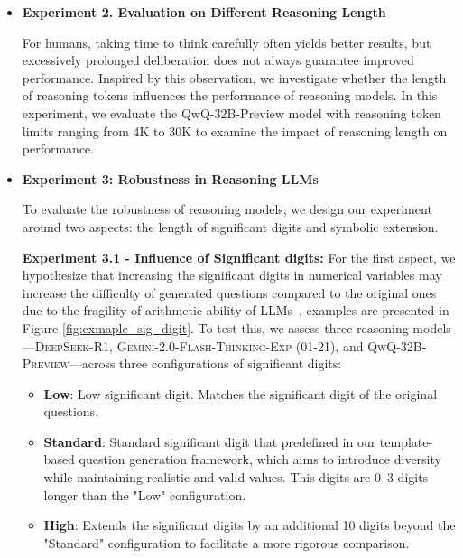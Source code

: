 {\begin{itemize}[topsep=5pt, leftmargin=1em]
By comparing model performances under these controlled settings, we can determine whether \name effectively differentiates their capabilities, thus validating its robustness as a benchmark.


\item \textbf{\hypertarget{exp:2}{Experiment 2}. Evaluation on Different Reasoning Length}

For humans, taking time to think carefully often yields better results, but excessively prolonged deliberation does not always guarantee improved performance. Inspired by this observation, we investigate whether the length of reasoning tokens influences the performance of reasoning models. In this experiment, we evaluate the QwQ-32B-Preview model with reasoning token limits ranging from 4K to 30K to examine the impact of reasoning length on performance.



\item \textbf{\hypertarget{exp:3}{Experiment 3}: Robustness in Reasoning LLMs}

To evaluate the robustness of reasoning models, we design our experiment around two aspects: the length of significant digits and symbolic extension.

\textbf{\hypertarget{exp:3.1}{Experiment 3.1} - Influence of Significant digits:} For the first aspect, we hypothesize that increasing the significant digits in numerical variables may increase the difficulty of generated questions compared to the original ones due to the fragility of arithmetic ability of LLMs~\cite{yang2024number, schwartz2024numerologic, singh2024tokenization}, examples are presented in Figure \ref{fig:exmaple_sig_digit}. To test this, we assess three reasoning models—\textsc{DeepSeek-R1}, \textsc{Gemini-2.0-Flash-Thinking-Exp (01-21)}, and \textsc{QwQ-32B-Preview}—across three configurations of significant digits:
\begin{itemize}[topsep=5pt, leftmargin=1em]
\item \textbf{Low}: Low significant digit. Matches the significant digit of the original questions.
\item \textbf{Standard}: Standard significant digit that predefined in our template-based question generation framework, which aims to introduce diversity while maintaining realistic and valid values. This digits are 0–3 digits longer than the "Low" configuration.
\item \textbf{High}: Extends the significant digits by an additional 10 digits beyond the "Standard" configuration to facilitate a more rigorous comparison.
\end{itemize}


\end{itemize}}
